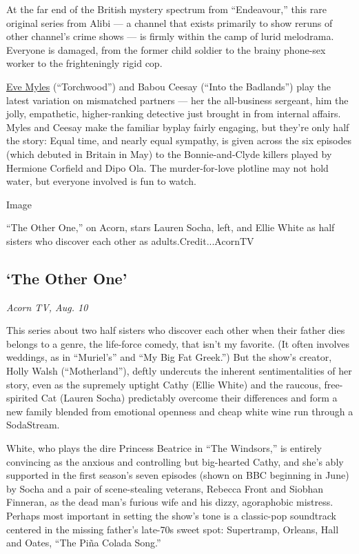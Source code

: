 At the far end of the British mystery spectrum from ``Endeavour,'' this
rare original series from Alibi --- a channel that exists primarily to
show reruns of other channel's crime shows --- is firmly within the camp
of lurid melodrama. Everyone is damaged, from the former child soldier
to the brainy phone-sex worker to the frighteningly rigid cop.

\href{https://www.nytimes3xbfgragh.onion/2019/08/30/arts/television/keeping-faith-eve-myles.html?searchResultPosition=2}{Eve
Myles} (``Torchwood'') and Babou Ceesay (``Into the Badlands'') play the
latest variation on mismatched partners --- her the all-business
sergeant, him the jolly, empathetic, higher-ranking detective just
brought in from internal affairs. Myles and Ceesay make the familiar
byplay fairly engaging, but they're only half the story: Equal time, and
nearly equal sympathy, is given across the six episodes (which debuted
in Britain in May) to the Bonnie-and-Clyde killers played by Hermione
Corfield and Dipo Ola. The murder-for-love plotline may not hold water,
but everyone involved is fun to watch.

Image

``The Other One,'' on Acorn, stars Lauren Socha, left, and Ellie White
as half sisters who discover each other as adults.Credit...AcornTV

\hypertarget{the-other-one}{%
\subsection{`The Other One'}\label{the-other-one}}

\emph{Acorn TV, Aug. 10}

This series about two half sisters who discover each other when their
father dies belongs to a genre, the life-force comedy, that isn't my
favorite. (It often involves weddings, as in ``Muriel's'' and ``My Big
Fat Greek.'') But the show's creator, Holly Walsh (``Motherland''),
deftly undercuts the inherent sentimentalities of her story, even as the
supremely uptight Cathy (Ellie White) and the raucous, free-spirited Cat
(Lauren Socha) predictably overcome their differences and form a new
family blended from emotional openness and cheap white wine run through
a SodaStream.

White, who plays the dire Princess Beatrice in ``The Windsors,'' is
entirely convincing as the anxious and controlling but big-hearted
Cathy, and she's ably supported in the first season's seven episodes
(shown on BBC beginning in June) by Socha and a pair of scene-stealing
veterans, Rebecca Front and Siobhan Finneran, as the dead man's furious
wife and his dizzy, agoraphobic mistress. Perhaps most important in
setting the show's tone is a classic-pop soundtrack centered in the
missing father's late-70s sweet spot: Supertramp, Orleans, Hall and
Oates, ``The Piña Colada Song.''


